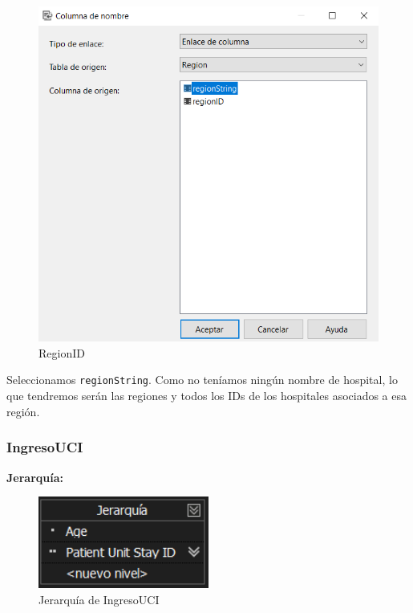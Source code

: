 \documentclass[12pt, a4paper, twoside]{article}
\begin{document}
\begin{figure}[H]
	\centering
	\includegraphics[width=1\textwidth]{image/RegionID}
	\caption{RegionID}
	\label{fig:16}
\end{figure}

Seleccionamos \texttt{regionString}. Como no teníamos ningún nombre de hospital, lo que tendremos serán las regiones y todos los IDs de los hospitales asociados a esa región.

\subsubsection{IngresoUCI}

\textbf{Jerarquía:}

\begin{figure}[H]
	\centering
	\includegraphics[width=0.5\textwidth]{image/JIngresoUCI}
	\caption{Jerarquía de IngresoUCI}
	\label{fig:17}
\end{figure}
\end{document}
